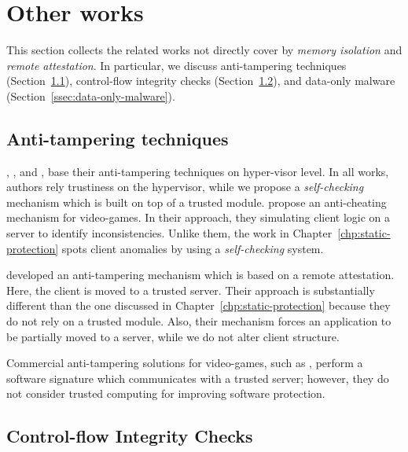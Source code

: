 \section{Other works}
\label{sec:miscellansous}

This section collects the related works not directly cover by \emph{memory 
isolation} and \emph{remote attestation}.
In particular, we discuss anti-tampering techniques 
(Section~\ref{ssec:anti-tampering-techniques}), control-flow integrity checks 
(Section~\ref{ssec:control-flow-integrity-checks}), and data-only malware 
(Section~\ref{ssec:data-only-malware}).

\subsection{Anti-tampering techniques}
\label{ssec:anti-tampering-techniques}

\cite{7371862}, \cite{ghosh2010secure}, and 
\cite{Dewan:2008:HSP:1400549.1400685}, base their anti-tampering techniques 
on hyper-visor level. 
In all works, authors rely trustiness on the hypervisor, while we propose a 
\emph{self-checking} mechanism which is built on top of a trusted module.
\cite{Feng:2008:SMC:1517494.1517497} propose an anti-cheating mechanism for 
video-games. In their approach, they simulating client logic on a server to 
identify inconsistencies.
Unlike them, the work in Chapter~\ref{chp:static-protection} spots client 
anomalies by using a \emph{self-checking} system.

\cite{viticchie2016reactive} developed an anti-tampering mechanism which is 
based on a remote attestation.
Here, the client is moved to a trusted server.
Their approach is substantially different than the one discussed in 
Chapter~\ref{chp:static-protection} because they do not rely on a trusted 
module.
Also, their mechanism forces an application to be partially moved to a server, 
while we do not alter client structure.

Commercial anti-tampering solutions for video-games, such 
as \citep{evenbalance,vac}, perform a software signature which communicates 
with a trusted server; however, they do not consider trusted computing for 
improving software protection.

\subsection{Control-flow Integrity Checks}
\label{ssec:control-flow-integrity-checks}

